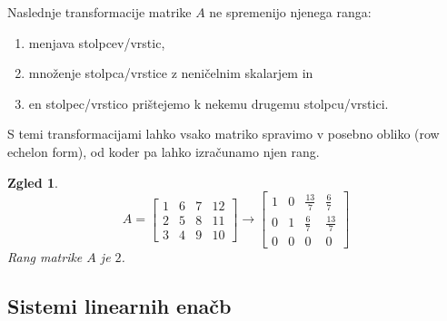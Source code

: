 \documentclass[10pt, a4paper]{article}
\newtheorem{zgled}{Zgled}[section]
\begin{document}
Naslednje transformacije matrike $A$ ne spremenijo njenega ranga:
\begin{enumerate}
    \item menjava stolpcev/vrstic,
    \item množenje stolpca/vrstice z neničelnim skalarjem in
    \item en stolpec/vrstico prištejemo k nekemu drugemu stolpcu/vrstici.
\end{enumerate}

S temi transformacijami lahko vsako matriko spravimo v posebno obliko (row echelon form), od koder pa lahko izračunamo njen rang.

\begin{zgled}
    \begin{equation*}
        A =
        \begin{bmatrix}
            1 & 6 & 7 & 12\\
            2 & 5 & 8 & 11\\
            3 & 4 & 9 & 10
        \end{bmatrix}
        \rightarrow 
        \begin{bmatrix}
            1 & 0 & \frac{13}{7} & \frac{6}{7}\\
            0 & 1 & \frac{6}{7} & \frac{13}{7}\\
            0 & 0 & 0 & 0
        \end{bmatrix}
    \end{equation*}
    Rang matrike $A$ je $2$.
\end{zgled}

\subsection{Sistemi linearnih enačb}
\end{document}
